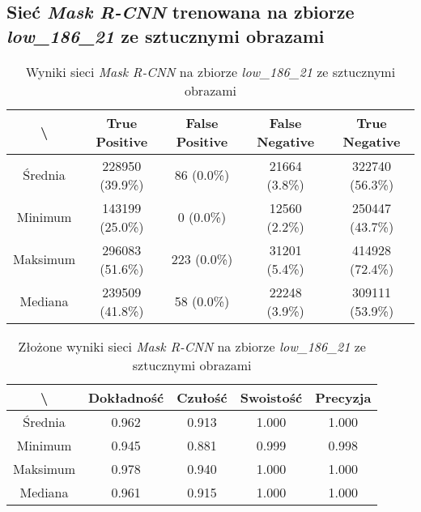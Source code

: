 \subsection{Sieć \textit{Mask R-CNN} trenowana na zbiorze \textit{low\_186\_21} ze sztucznymi obrazami}
\lowprocent

\begin{table}[H]
	\centering
	\caption{Wyniki sieci \textit{Mask R-CNN} na zbiorze \textit{low\_186\_21} ze sztucznymi obrazami}
	\vspace{6pt}
	{\footnotesize
		\begin{tabular}{|c|c|c|c|c|}
      \hline \textbackslash & True Positive & False Positive & False Negative & True Negative \\
      \hline Średnia & 228950 (39.9\%) & 86 (0.0\%) & 21664 (3.8\%) & 322740 (56.3\%) \\
      \hline Minimum & 143199 (25.0\%) & 0 (0.0\%) & 12560 (2.2\%) & 250447 (43.7\%) \\
      \hline Maksimum & 296083 (51.6\%) & 223 (0.0\%) & 31201 (5.4\%) & 414928 (72.4\%) \\
      \hline Mediana & 239509 (41.8\%) & 58 (0.0\%) & 22248 (3.9\%) & 309111 (53.9\%) \\
      \hline
		\end{tabular}
	}
  \vspace{0pt}
  \label{Tab:low_original_generated}
\end{table}


\begin{table}[H]
	\centering
	\caption{Złożone wyniki sieci \textit{Mask R-CNN} na zbiorze \textit{low\_186\_21} ze sztucznymi obrazami}
	\vspace{6pt}
	{\footnotesize
		\begin{tabular}{|c|c|c|c|c|}
      \hline \textbackslash & Dokładność & Czułość & Swoistość & Precyzja \\
      \hline Średnia & 0.962 & 0.913 & 1.000 & 1.000 \\
      \hline Minimum & 0.945 & 0.881 & 0.999 & 0.998 \\
      \hline Maksimum & 0.978 & 0.940 & 1.000 & 1.000 \\
      \hline Mediana & 0.961 & 0.915 & 1.000 & 1.000 \\
      \hline
		\end{tabular}
	}
  \vspace{0pt}
  \label{Tab:low_original_generated_calculated}
\end{table}

